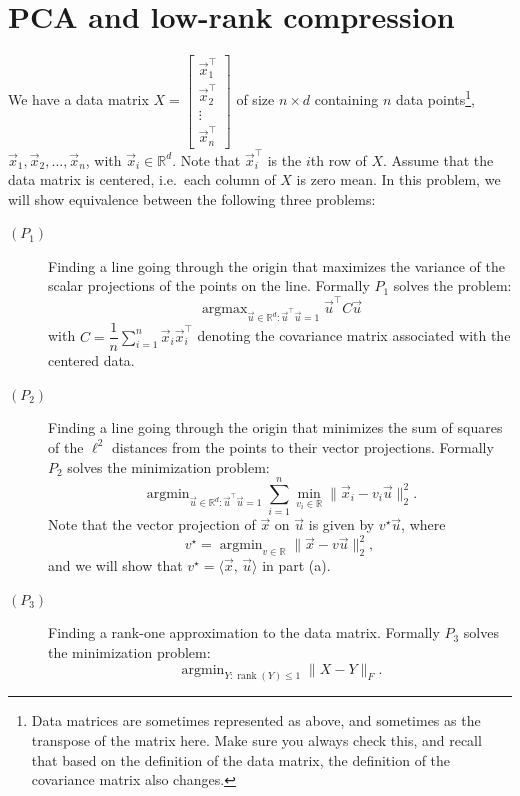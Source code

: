 \documentclass[10pt]{article}
\theoremstyle{definition}
\theoremstyle{plain}
\newcommand{\RR}{\mathbb{R}}
\DeclareMathOperator{\rank}{rank}
\DeclareMathOperator{\argmin}{argmin}
\DeclareMathOperator{\argmax}{argmax}
\begin{document}
\newpage

\section{PCA and low-rank compression}

We have a data matrix $X = \begin{bmatrix} \vec{x}_1^\top \\ \vec{x}_2^\top \\ \vdots \\ \vec{x}_n^\top \end{bmatrix}$ of size $n \times d$ containing $n$ data points\footnote{Data matrices are sometimes represented as above, and sometimes as the transpose of the matrix here. Make sure you always check this, and recall that based on the definition of the data matrix, the definition of the covariance matrix also changes.}, $\vec{x}_1, \vec{x}_2, \ldots, \vec{x}_n$, with $\vec{x}_i \in \RR^d$. Note that $\vec{x}_i^\top$ is the $i$th row of $X$. Assume that the data matrix is centered, i.e.\ each column of $X$ is zero mean. In this problem, we will show equivalence between the following three problems:

\begin{description}
\item[$(P_1)$] Finding a line going through the origin that maximizes the variance of the scalar projections of the points on the line. Formally $P_1$ solves the problem:
\begin{equation}
\argmax_{\vec{u} \in \RR^d : \vec{u}^\top \vec{u} = 1} \vec{u}^\top C \vec{u}
\end{equation}
with $C = \dfrac{1}{n} \displaystyle\sum_{i=1}^{n} \vec{x}_i \vec{x}_i^\top$ denoting the covariance matrix associated with the centered data.

\item[$(P_2)$] Finding a line going through the origin that minimizes the sum of squares of the $\ell^2$ distances from the points to their vector projections. Formally $P_2$ solves the minimization problem:
\begin{equation}
\argmin_{\vec{u} \in \RR^d : \vec{u}^\top \vec{u} = 1} \sum_{i=1}^{n} \min_{v_i \in \RR} \|\vec{x}_i - v_i \vec{u}\|_2^2.
\end{equation}
Note that the vector projection of $\vec{x}$ on $\vec{u}$ is given by $v^\star \vec{u}$, where
\begin{equation}
v^\star = \argmin_{v \in \RR} \|\vec{x} - v\vec{u}\|_2^2,
\end{equation}
and we will show that $v^\star = \langle \vec{x},\, \vec{u} \rangle$ in part (a).

\item[$(P_3)$] Finding a rank-one approximation to the data matrix. Formally $P_3$ solves the minimization problem:
\begin{equation}
\argmin_{Y : \rank(Y) \le 1} \|X - Y\|_F.
\end{equation}
\end{description}
\end{document}
